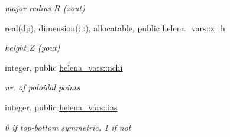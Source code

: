 \begin{DoxyCompactItemize}
\begin{DoxyCompactList}\small\item\em major radius $R$ (xout) \end{DoxyCompactList}\item 
real(dp), dimension(\+:,\+:), allocatable, public \hyperlink{namespacehelena__vars_a41e897edb2a8b34fa7bde28ff57d012a}{helena\+\_\+vars\+::z\+\_\+h}
\begin{DoxyCompactList}\small\item\em height $Z$ (yout) \end{DoxyCompactList}\item 
integer, public \hyperlink{namespacehelena__vars_a0489f36c6549c35a745ec6d540940d93}{helena\+\_\+vars\+::nchi}
\begin{DoxyCompactList}\small\item\em nr. of poloidal points \end{DoxyCompactList}\item 
integer, public \hyperlink{namespacehelena__vars_a009c168bb16124399a6059f7a6107a56}{helena\+\_\+vars\+::ias}
\begin{DoxyCompactList}\small\item\em 0 if top-\/bottom symmetric, 1 if not \end{DoxyCompactList}\end{DoxyCompactItemize}
